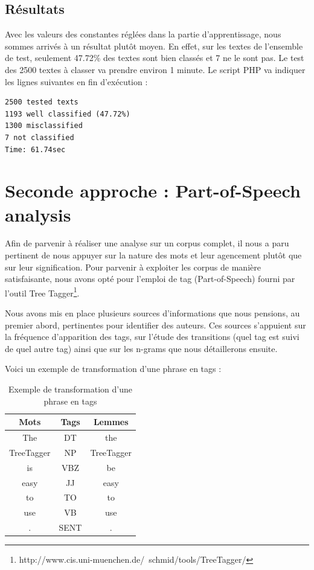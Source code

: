 \documentclass[a4paper,12pt]{report}
\begin{document}
\subsection{Résultats}
Avec les valeurs des constantes réglées dans la partie d'apprentissage, nous sommes arrivés à un résultat plutôt moyen. En effet, sur les textes de l'ensemble de test, seulement 47.72\% des textes sont bien classés et 7 ne le sont pas. Le test des 2500 textes à classer va prendre environ 1 minute. 
Le script PHP va indiquer les lignes suivantes en fin d'exécution : 
\begin{verbatim}
2500 tested texts
1193 well classified (47.72%)
1300 misclassified
7 not classified
Time: 61.74sec
\end{verbatim}







\section{Seconde approche : Part-of-Speech analysis}

Afin de parvenir à réaliser une analyse sur un corpus complet, il nous a paru pertinent de nous appuyer sur la nature des mots et leur agencement plutôt que sur leur signification. Pour parvenir à exploiter les corpus de manière satisfaisante, nous avons opté pour l'emploi de tag (Part-of-Speech) fourni par l'outil Tree Tagger\footnote{http://www.cis.uni-muenchen.de/~schmid/tools/TreeTagger/}.

Nous avons mis en place plusieurs sources d'informations que nous pensions, au premier abord, pertinentes pour identifier des auteurs. Ces sources s'appuient sur la fréquence d'apparition des tags, sur l'étude des transitions (quel tag est suivi de quel autre tag) ainsi que sur les n-grams que nous détaillerons ensuite.

Voici un exemple de transformation d'une phrase en tags : 

\begin{table}[hbtp]
	\centering
		\begin{tabular}{|*{3}{c|}}
			\hline
			\textbf{Mots} & \textbf{Tags} & \textbf{Lemmes}\\
			\hline
			The & DT & the \\
			\hline
			TreeTagger & NP  & TreeTagger \\
			\hline
			is & VBZ  & be \\
			\hline
			easy & JJ & easy \\
			\hline
			 to & TO & to \\
			\hline
			use  & VB  & use \\
			\hline
			. & SENT & . \\
			\hline
		\end{tabular}
	\caption{Exemple de transformation d'une phrase en tags}
	\label{fig:TableauTag}
\end{table}
\end{document}
